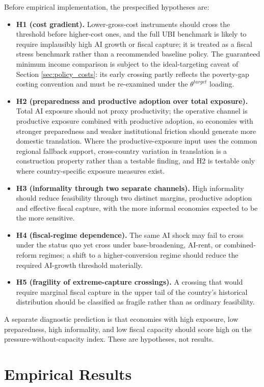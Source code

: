 \documentclass[11pt,a4paper]{article}
\begin{document}
Before empirical implementation, the prespecified hypotheses are:
\begin{itemize}
    \item \textbf{H1 (cost gradient).} Lower-gross-cost instruments should cross the threshold before higher-cost ones, and the full UBI benchmark is likely to require implausibly high AI growth or fiscal capture; it is treated as a fiscal stress benchmark rather than a recommended baseline policy. The guaranteed minimum income comparison is subject to the ideal-targeting caveat of Section \ref{sec:policy_costs}: its early crossing partly reflects the poverty-gap costing convention and must be re-examined under the $\theta^{target}$ loading.
    \item \textbf{H2 (preparedness and productive adoption over total exposure).} Total AI exposure should not proxy productivity; the operative channel is productive exposure combined with productive adoption, so economies with stronger preparedness and weaker institutional friction should generate more domestic translation. Where the productive-exposure input uses the common regional fallback support, cross-country variation in translation is a construction property rather than a testable finding, and H2 is testable only where country-specific exposure measures exist.
    \item \textbf{H3 (informality through two separate channels).} High informality should reduce feasibility through two distinct margins, productive adoption and effective fiscal capture, with the more informal economies expected to be the more sensitive.
    \item \textbf{H4 (fiscal-regime dependence).} The same AI shock may fail to cross under the status quo yet cross under base-broadening, AI-rent, or combined-reform regimes; a shift to a higher-conversion regime should reduce the required AI-growth threshold materially.
    \item \textbf{H5 (fragility of extreme-capture crossings).} A crossing that would require marginal fiscal capture in the upper tail of the country's historical distribution should be classified as fragile rather than as ordinary feasibility.
\end{itemize}
A separate diagnostic prediction is that economies with high exposure, low preparedness, high informality, and low fiscal capacity should score high on the pressure-without-capacity index.
These are hypotheses, not results.

\section{Empirical Results}\label{sec:empirical_results}
\end{document}

